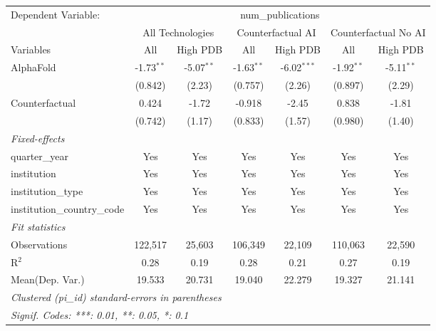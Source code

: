 \begingroup
\centering
\begin{tabular}{lcccccc}
   \tabularnewline \midrule \midrule
   Dependent Variable: & \multicolumn{6}{c}{num\_publications}\\
 & \multicolumn{2}{c}{All Technologies} & \multicolumn{2}{c}{Counterfactual AI} & \multicolumn{2}{c}{Counterfactual No AI} \\
\cmidrule(lr){1-1}\cmidrule(lr){2-3} \cmidrule(lr){4-5} \cmidrule(lr){6-7}
Variables & \multicolumn{1}{c}{All} & \multicolumn{1}{c}{High PDB} & \multicolumn{1}{c}{All} & \multicolumn{1}{c}{High PDB} & \multicolumn{1}{c}{All} & \multicolumn{1}{c}{High PDB} \\
\cmidrule(lr){1-1}\cmidrule(lr){2-2} \cmidrule(lr){3-3} \cmidrule(lr){4-4} \cmidrule(lr){5-5} \cmidrule(lr){6-6} \cmidrule(lr){7-7}
   AlphaFold                    & -1.73$^{**}$ & -5.07$^{**}$ & -1.63$^{**}$ & -6.02$^{***}$ & -1.92$^{**}$ & -5.11$^{**}$\\   
                                & (0.842)      & (2.23)       & (0.757)      & (2.26)        & (0.897)      & (2.29)\\   
   Counterfactual               & 0.424        & -1.72        & -0.918       & -2.45         & 0.838        & -1.81\\   
                                & (0.742)      & (1.17)       & (0.833)      & (1.57)        & (0.980)      & (1.40)\\   
   \midrule
   \emph{Fixed-effects}\\
   quarter\_year                & Yes          & Yes          & Yes          & Yes           & Yes          & Yes\\  
   institution                  & Yes          & Yes          & Yes          & Yes           & Yes          & Yes\\  
   institution\_type            & Yes          & Yes          & Yes          & Yes           & Yes          & Yes\\  
   institution\_country\_code   & Yes          & Yes          & Yes          & Yes           & Yes          & Yes\\  
   \midrule
   \emph{Fit statistics}\\
   Observations                 & 122,517      & 25,603       & 106,349      & 22,109        & 110,063      & 22,590\\  
   R$^2$                        & 0.28         & 0.19         & 0.28         & 0.21          & 0.27         & 0.19\\  
Mean(Dep. Var.) & 19.533 & 20.731 & 19.040 & 22.279 & 19.327 & 21.141 \\
   \midrule \midrule
   \multicolumn{7}{l}{\emph{Clustered (pi\_id) standard-errors in parentheses}}\\
   \multicolumn{7}{l}{\emph{Signif. Codes: ***: 0.01, **: 0.05, *: 0.1}}\\
\end{tabular}
\par\endgroup

